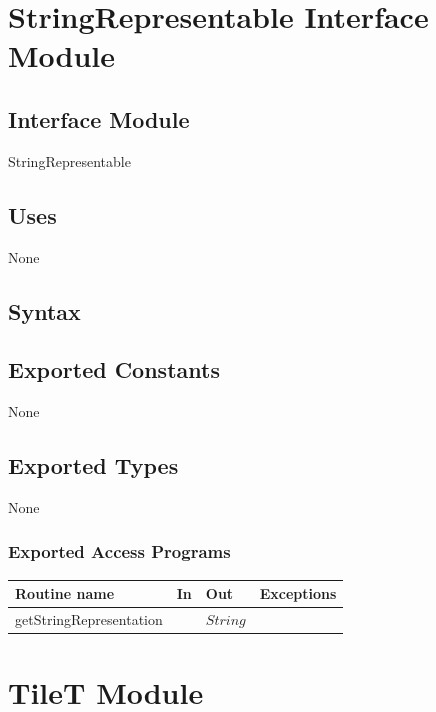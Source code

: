 \documentclass[12pt]{article}
\begin{document}
\newpage

\section* {StringRepresentable Interface Module}

\subsection* {Interface Module}

StringRepresentable

\subsection*{Uses}

None

\subsection* {Syntax}

\subsection*{Exported Constants}

None

\subsection*{Exported Types}

None

\subsubsection* {Exported Access Programs}

\begin{tabular}{| l | l | l | p{6cm} |}
  \hline
  \textbf{Routine name}   & \textbf{In} & \textbf{Out} & \textbf{Exceptions} \\
  \hline
  getStringRepresentation &             & $String$     &                     \\
  \hline
\end{tabular}

\newpage

\section* {TileT Module}
\end{document}
